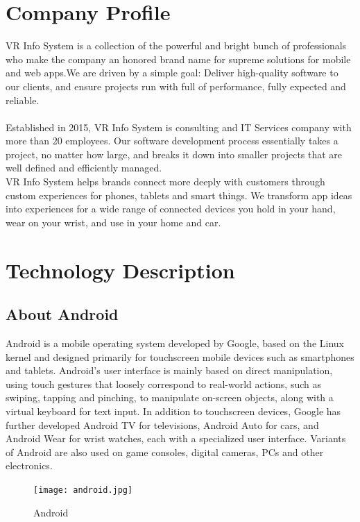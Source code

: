 \documentclass[twoside,a4paper,16pt]{book}
\begin{document}
\chapter{\bf Company Profile}
VR Info System is a collection of the powerful and bright bunch of professionals who make the company an honored brand name for supreme solutions for mobile and web apps.We are driven by a simple goal: Deliver high-quality software to our clients, and ensure projects run with full of performance, fully expected and reliable.\\\\
Established in 2015, VR Info System is consulting and IT Services company with more than 20 employees. Our software development process essentially takes a project, no matter how large, and breaks it down into smaller projects that are well defined and efficiently managed.\\
VR Info System helps brands connect more deeply with customers through custom experiences for phones, tablets and smart things. We transform app ideas into experiences for a wide range of connected devices you hold in your hand, wear on your wrist, and use in your home and car.

\chapter{\bf Technology Description} 
\section{About Android}
Android is a mobile operating system developed by Google, based on the Linux kernel and designed primarily for touchscreen mobile devices such as smartphones and tablets. Android's user interface is mainly based on direct manipulation, using touch gestures that loosely correspond to real-world actions, such as swiping, tapping and pinching, to manipulate on-screen objects, along with a virtual keyboard for text input. In addition to touchscreen devices, Google has further developed Android TV for televisions, Android Auto for cars, and Android Wear for wrist watches, each with a specialized user interface. Variants of Android are also used on game consoles, digital cameras, PCs and other electronics.\\

\vspace{0.5cm}

\begin{figure}[ht!]
\begin{center}
\texttt{[image: android.jpg]}
\caption{Android}
\end{center}
\end{figure}
\end{document}
